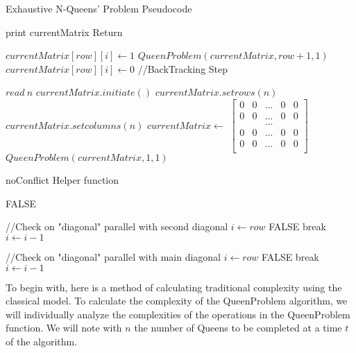 \begin{algorithm}[H]
\caption{Exhaustive N-Queens’ Problem Pseudocode}
\begin{algorithmic}[1]
	\State print currentMatrix
	\State Return

\EndIf
{}
		\State $currentMatrix[row][i] \gets 1$
		\State $QueenProblem(currentMatrix,row+1,1)$
		\State $currentMatrix[row][i] \gets 0$
		//BackTracking Step
	\EndIf
\EndFor
\EndProcedure
{}

\State $read\ n$
\State $currentMatrix.initiate()$
\State $currentMatrix.setrows(n)$
\State $currentMatrix.setcolumns(n)$
\State $currentMatrix \gets$
$\left[\begin{array}{ccccc}
0 & 0 & ... & 0 & 0	\\
0 & 0 & ... & 0 & 0	\\
 &  & ... &  & 	\\
0 & 0 & ... & 0 & 0	\\
0 & 0 & ... & 0 & 0	\\
\end{array}\right]$ 
\State $QueenProblem(currentMatrix,1,1)$
\EndProcedure
\end{algorithmic}
\end{algorithm}

\begin{algorithm}[H]
\caption{noConflict Helper function}
\begin{algorithmic}[1]
			\State \Return FALSE
		\EndIf
	\EndFor
	
	
	//Check on "diagonal" parallel with second diagonal
	\State $i \gets row$
			\State \Return FALSE
		\EndIf
		\State break
	\EndIf
	\State $i \gets i-1$	
	\EndFor
	
	//Check on "diagonal" parallel with main diagonal
	\State $i \gets row$
			\State \Return FALSE
		\EndIf
		\State break
	\EndIf
	\State $i \gets i-1$	
	\EndFor

\EndProcedure

\end{algorithmic}
\end{algorithm}

To begin with, here is a method of calculating traditional complexity using the classical model.
To calculate the complexity of the QueenProblem algorithm, we will individually analyze the complexities of the operations in the QueenProblem function. We will note with $n$ the number of Queens to be completed at a time $ t $ of the algorithm.

